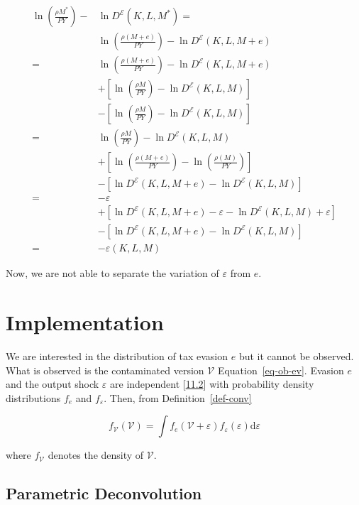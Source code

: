 \documentclass[
  12pt]{article}
\theoremstyle{definition}
\theoremstyle{remark}
\begin{document}
\[
\begin{aligned}
    \ln\left(\frac{\rho M^*}{PY}\right)-&\ln D^{\mathcal{E}}(K,L,M^*)=\\
    &\ln\left(\frac{\rho(M+e)}{PY}\right)-\ln D^{\mathcal{E}}(K,L,M+e)\\
    =&\ln\left(\frac{\rho(M+e)}{PY}\right)-\ln D^{\mathcal{E}}(K,L,M+e)\\
    &+\left[\ln\left(\frac{\rho M}{PY}\right)-\ln D^{\mathcal{E}}(K,L,M)\right]\\
    &-\left[\ln\left(\frac{\rho M}{PY}\right)-\ln D^{\mathcal{E}}(K,L,M)\right] \\
    =&\ln\left(\frac{\rho M}{PY}\right)-\ln D^{\mathcal{E}}(K,L,M) \\
    &+\left[\ln\left(\frac{\rho(M+e)}{PY}\right)-\ln\left(\frac{\rho(M)}{PY}\right)\right]\\
    &-\left[\ln D^{\mathcal{E}}(K,L,M+e)-\ln D^{\mathcal{E}}(K,L,M)\right]\\
    =& -\varepsilon \\
    &+\left[\ln D^{\mathcal{E}}(K,L,M+e)-\varepsilon-\ln D^{\mathcal{E}}(K,L,M)+\varepsilon\right]\\
    &-\left[\ln D^{\mathcal{E}}(K,L,M+e)-\ln D^{\mathcal{E}}(K,L,M)\right]\\
    =& -\varepsilon(K,L,M)
\end{aligned}
\]

Now, we are not able to separate the variation of \(\varepsilon\) from
\(e\).

\section{Implementation}\label{implementation}

We are interested in the distribution of tax evasion \(e\) but it cannot
be observed. What is observed is the contaminated version
\(\mathcal{V}\) Equation~\ref{eq-ob-ev}. Evasion \(e\) and the output
shock \(\varepsilon\) are independent {[}\hyperref[ass-ind]{11.2}{]}
with probability density distributions \(f_e\) and \(f_{\varepsilon}\).
Then, from Definition~\ref{def-conv}

\[
f_{\mathcal{V}}(\mathcal{V})=\int f_e(\mathcal{V}+\varepsilon)f_{\varepsilon}(\varepsilon)\text{d}\varepsilon
\]

where \(f_{\mathcal{V}}\) denotes the density of \(\mathcal{V}\).

\subsection{Parametric Deconvolution}\label{parametric-deconvolution}
\end{document}
